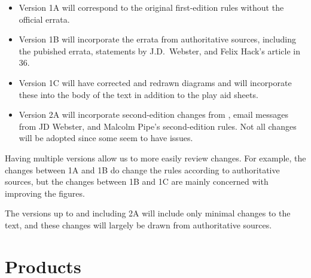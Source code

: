\documentclass[10pt]{article}
\begin{document}
\begin{itemize}
    \item Version 1A will correspond to the original first-edition rules without the official errata.
    \item Version 1B will incorporate the errata from authoritative sources, including the pubished errata, statements by J.D.\ Webster, and Felix Hack’s article in {\APJ} 36.
    \item Version 1C will have corrected and redrawn diagrams and will incorporate these into the body of the text in addition to the play aid sheets.
    \item Version 2A will incorporate second-edition changes from {\APJ}, email messages from JD Webster, and  Malcolm Pipe’s second-edition rules. Not all changes will be adopted since some seem to have issues.
\end{itemize}


Having multiple versions allow us to more easily review changes. For example, the changes between 1A and 1B do change the rules according to authoritative sources, but the changes between 1B and 1C are mainly concerned with improving the figures.

The versions up to and including 2A will include only minimal changes to the text, and these changes will largely be drawn from authoritative sources. 


\section*{Products}
\end{document}
